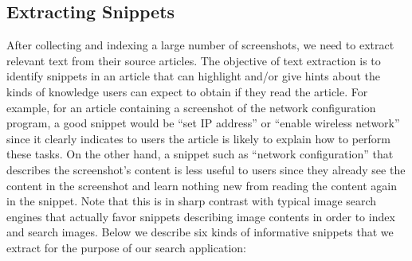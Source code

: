 \documentclass{www2010-submission}
\begin{document}
\subsection{Extracting Snippets}
\label{sec:extracting_snippets}

After collecting and indexing a large number of screenshots, we need
to extract relevant text from their source articles. The objective of
text extraction is to identify snippets in an article that can
highlight and/or give hints about the kinds of knowledge users can
expect to obtain if they read the article. For example, for an article
containing a screenshot of the network configuration program, a good
snippet would be ``set IP address'' or ``enable wireless network''
since it clearly indicates to users the article is likely to explain
how to perform these tasks. On the other hand, a snippet such as
``network configuration'' that describes the screenshot's content is
less useful to users since they already see the content in the
screenshot and learn nothing new from reading the content again in the
snippet. Note that this is in sharp contrast with typical image search
engines that actually favor snippets describing image contents in
order to index and search images. Below we describe six kinds of
informative snippets that we extract for the purpose of our search
application:
\end{document}
